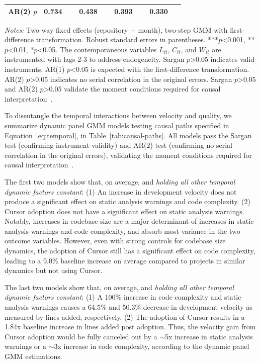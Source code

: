 \begin{table}
\begin{threeparttable}
\begin{tabular}{lrrrr}
AR(2) $p$ & 0.734$^{\textcolor{white}{***}}$ & 0.438$^{\textcolor{white}{***}}$ & 0.393$^{\textcolor{white}{***}}$ & 0.330$^{\textcolor{white}{***}}$ \\
\bottomrule
\end{tabular}
\begin{tablenotes}
\small
\item \textit{Notes:} Two-way fixed effects (repository + month), two-step GMM with first-difference transformation. 
Robust standard errors in parentheses. ***$p$<0.001, **$p$<0.01, *$p$<0.05. The contemporaneous variables $L_{it}$, $C_{it}$, and $W_{it}$ are instrumented with lags 2-3 to address endogeneity. Sargan $p$>0.05 indicates valid instruments. AR(1) $p$<0.05 is expected with the first-difference transformation. AR(2) $p$>0.05 indicates no serial correlation in the original errors. Sargan $p$>0.05 and AR(2) $p$>0.05 validate the moment conditions required for causal interpretation~\cite{arellano1991some}.
\end{tablenotes}
\end{threeparttable}
\end{table}

To disentangle the temporal interactions between velocity and quality, we summarize dynamic panel GMM models testing causal paths specified in Equation~\ref{eq:temporal}, in Table~\ref{tab:causal-paths}.
All models pass the Sargan test (confirming instrument validity) and AR(2) test (confirming no serial correlation in the original errors), validating the moment conditions required for causal interpretation~\cite{arellano1991some}.

The first two models show that, on average, and \emph{holding all other temporal dynamic factors constant}: 
(1) An increase in development velocity does not produce a significant effect on static analysis warnings and code complexity.
(2) Cursor adoption does not have a significant effect on static analysis warnings.
Notably, increases in codebase size are a major determinant of increases in static analysis warnings and code complexity, and absorb most variance in the two outcome variables.
However, even with strong controls for codebase size dynamics, the adoption of Cursor still has a significant effect on code complexity, leading to a 9.0\% baseline increase on average compared to projects in similar dynamics but not using Cursor.

The last two models show that, on average, and \emph{holding all other temporal dynamic factors constant}: (1) A 100\% increase in code complexity and static analysis warnings causes a 64.5\% and 50.3\% decrease in development velocity as measured by lines added, respectively.
(2) The adoption of Cursor results in a 1.84x baseline increase in lines added post adoption.
Thus, the velocity gain from Cursor adoption would be fully canceled out by a $\sim$5x increase in static analysis warnings or a $\sim$3x increase in code complexity, according to the dynamic panel GMM estimations.


